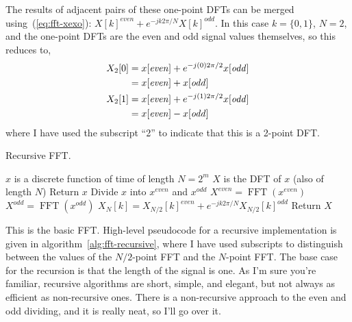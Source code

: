 The results of adjacent pairs of these one-point DFTs can be merged
using~(\ref{eq:fft-xexo}): $X[k]^{\mathit{even}} +
e^{-jk2\pi/N}X[k]^{\mathit{odd}}$. In this case $k=\{0,1\}$, $N=2$,
and the one-point DFTs are the even and odd signal values themselves,
so this reduces to,
\begin{align}
  X_2[0] &= x[\mathit{even}] + e^{-j(0)2\pi/2}x[\mathit{odd}] \notag \\
         &= x[\mathit{even}] + x[\mathit{odd}] \label{eq:2fft-even}\\
  X_2[1] &= x[\mathit{even}] + e^{-j(1)2\pi/2}x[\mathit{odd}] \notag \\
         &= x[\mathit{even}] - x[\mathit{odd}] \label{eq:2fft-odd}
\end{align}
where I have used the subscript ``2'' to indicate that this is a
2-point DFT.

\begin{algorithm}
\caption{Recursive FFT.\label{alg:fft-recursive}}
\begin{algorithmic}
\REQUIRE $x$ is a discrete function of time of length $N=2^m$
\ENSURE $X$ is the DFT of $x$ (also of length $N$)
   \STATE Return $x$
\ELSE
   \STATE Divide $x$ into $x^\mathit{even}$ and $x^\mathit{odd}$
   \STATE $X^\mathit{even} = \operatorname{FFT}(x^\mathit{even})$
   \STATE $X^\mathit{odd} = \operatorname{FFT}(x^\mathit{odd})$
      \STATE $X_N[k] = X_{N/2}[k]^\mathit{even} +
                       e^{-jk2\pi/N}X_{N/2}[k]^\mathit{odd}$ 
   \ENDFOR
   \STATE Return $X$
\ENDIF
\end{algorithmic}
\end{algorithm}

This is the basic FFT.  High-level pseudocode for a recursive
implementation is given in algorithm~\ref{alg:fft-recursive}, where I
have used subscripts to distinguish between the values of the
$N/2$-point FFT and the $N$-point FFT. The base case for the recursion
is that the length of the signal is one. As I'm sure you're familiar,
recursive algorithms are short, simple, and elegant, but not always as
efficient as non-recursive ones.  There is a non-recursive approach to
the even and odd dividing, and it is really neat, so I'll go over it.

